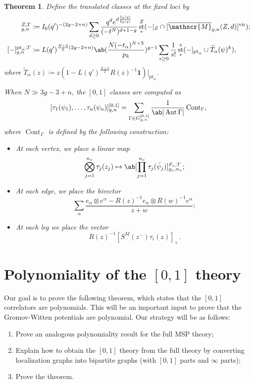 \documentclass[10pt]{amsart}
\newtheorem{thm}{Theorem}[section]
\theoremstyle{definition}
\theoremstyle{remark}
\theoremstyle{plain}
\theoremstyle{definition}
\theoremstyle{remark}
\newcommand{\msc}[1]{\mathscr{#1}}
\newcommand{\mr}[1]{\mathrm{#1}}
\newcommand{\on}[1]{\operatorname{#1}}
\newcommand{\ol}[1]{\overline{#1}}
\newcommand{\wt}[1]{\widetilde{#1}}
\newcommand{\1}{\mathbf{1}}
\newcommand{\2}{\mathbf{2}}
\newcommand{\3}{\mathbf{3}}
\newcommand{\vir}{\mr{vir}}
\newcommand{\pt}{\mr{pt}}
\DeclareMathOperator{\Aut}{Aut}
\DeclareMathOperator{\st}{st}
\numberwithin{equation}{section}
\begin{document}
\begin{thm}\label{thm:01cohft}
    Define the translated classes at the fixed loci by
    \begin{align*}
        [-]_{g,n}^{Z,T} &\coloneqq I_0(q')^{-(2g-2+n)} \sum_{d \geq 0} \frac{q^d e^{d\frac{I_1(q)}{I_0(q)}}}{(-t^N)^{d+1-g}} \st^Z_* (-|_Z \cap [\ol{\msc{M}}_{g,n}(Z,d)]^{\vir}); \\
        [-]_{g,n}^{\pt_{\alpha},T} &\coloneqq L(q')^{\frac{N+3}{2}(2g-2+n)} \ab(\frac{N(-t_{\alpha})^{N+3}}{p_k})^{g-1} \sum_{s \geq 0} \frac{1}{s!} \st^s_* (-|_{\pt_{\alpha}} \cup \wt{T}_{\alpha}(\psi)^k),
    \end{align*}
    where $\wt{T}_{\alpha}(z) \coloneqq z(1-L(q')^{\frac{N+3}{2}}R(z)^{-1} \1)|_{\pt_{\alpha}}$.

    When $N \gg 3g-3+n$, the $[0,1]$ classes are computed as
    \[ [\tau_1(\psi_1), \ldots, \tau_n(\psi_n)]^{[0,1]}_{g,n} = \sum_{\Gamma \in G_{g,n}^{[0,1]}} \frac{1}{\ab|\Aut\Gamma|} \on{Cont}_{\Gamma}, \]
    where $\on{Cont}_{\Gamma}$ is defined by the following construction:
    \begin{itemize}
        \item At each vertex, we place a linear map
            \[ \bigotimes_{j=1}^{n_v} \tau_j(z_j) \mapsto \ab[\prod_{j=1}^{n_v} \tau_j(\bar{\psi}_j)]_{g_v, n_v}^{F_v, T}; \]
        \item At each edge, we place the bivector
            \[ \sum_{\alpha} \frac{e_{\alpha} \otimes e^{\alpha} - R(z)^{-1} e_{\alpha} \otimes R(w)^{-1}e^{\alpha}}{z+w}; \]
        \item At each leg we place the vector
            \[ R(z)^{-1} [S^M(z^-)\tau_i(z)]_+. \]
    \end{itemize}
\end{thm}


\section{Polynomiality of the $[0,1]$ theory}%
\label{sec:Polynomiality of the 01 theory}

Our goal is to prove the following theorem, which states that the $[0,1]$ correlators are polynomials. This will be an important input to prove that the Gromov-Witten potentials are polynomial. Our strategy will be as follows:
\begin{enumerate}
    \item Prove an analogous polynomiality result for the full MSP theory;
    \item Explain how to obtain the $[0,1]$ theory from the full theory by converting localization graphs into bipartite graphs (with $[0,1]$ parts and $\infty$ parts);
    \item Prove the theorem.
\end{enumerate}
\end{document}
